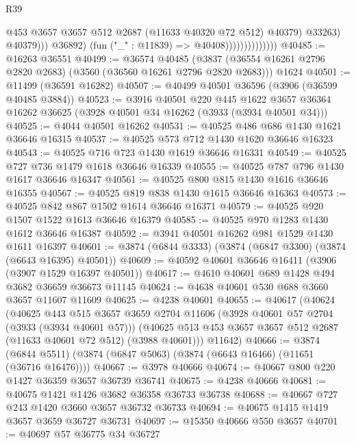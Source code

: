 \begin{lexlean}{R39}
\begin{coremodule}
                                          @453
                                          @3657
                                          @3657
                                          @512
                                          @2687
                                          (@11633 @40320 @72 @512)
                                          @40379)
                                        @33263)
                                      @40379)))
                                @36892)
                              (fun ("_" : @11839) => @40408))))))))))))))
@40485 := @16263 @36551
@40499 := @36574
    @40485
    (@3837 (@36554 @16261 @2796 @2820 @2683) (@3560 (@36560 @16261 @2796 @2820 @2683)))
    @1624
@40501 := @11499 (@36591 @16282)
@40507 := @40499 @40501 @36596 (@3906 (@36599 @40485 @3884))
@40523 := @3916
    @40501
    @220
    @445
    @1622
    @3657
    @36364
    @16262
    @36625
    (@3928 @40501 @34 @16262 (@3933 (@3934 @40501 @34)))
@40525 := @4044 @40501 @16262
@40531 := @40525 @486 @686 @1430 @1621 @36646 @16315
@40537 := @40525 @573 @712 @1430 @1620 @36646 @16323
@40543 := @40525 @716 @723 @1430 @1619 @36646 @16331
@40549 := @40525 @727 @736 @1479 @1618 @36646 @16339
@40555 := @40525 @787 @796 @1430 @1617 @36646 @16347
@40561 := @40525 @800 @815 @1430 @1616 @36646 @16355
@40567 := @40525 @819 @838 @1430 @1615 @36646 @16363
@40573 := @40525 @842 @867 @1502 @1614 @36646 @16371
@40579 := @40525 @920 @1507 @1522 @1613 @36646 @16379
@40585 := @40525 @970 @1283 @1430 @1612 @36646 @16387
@40592 := @3941 @40501 @16262 @981 @1529 @1430 @1611 @16397
@40601 := @3874 (@6844 @3333) (@3874 (@6847 @3300) (@3874 (@6643 @16395) @40501))
@40609 := @40592 @40601 @36646 @16411 (@3906 (@3907 @1529 @16397 @40501))
@40617 := @4610 @40601 @689 @1428 @494 @3682 @36659 @36673 @11145
@40624 := @4638 @40601 @530 @688 @3660 @3657 @11607 @11609
@40625 := @4238 @40601
@40655 := @40617
    (@40624
      (@40625
        @443
        @515
        @3657
        @3659
        @2704
        @11606
        (@3928 @40601 @57 @2704 (@3933 (@3934 @40601 @57)))
        (@40625 @513 @453 @3657 @3657 @512 @2687 (@11633 @40601 @72 @512) (@3988 @40601)))
      @11642)
@40666 := @3874 (@6844 @5511) (@3874 (@6847 @5063) (@3874 (@6643 @16466) (@11651 (@36716 @16476))))
@40667 := @3978 @40666
@40674 := @40667 @800 @220 @1427 @36359 @3657 @36739 @36741
@40675 := @4238 @40666
@40681 := @40675 @1421 @1426 @3682 @36358 @36733 @36738
@40688 := @40667 @727 @243 @1420 @3660 @3657 @36732 @36733
@40694 := @40675 @1415 @1419 @3657 @3659 @36727 @36731
@40697 := @15350 @40666 @550 @3657
@40701 := @40697 @57 @36775 @34 @36727

\end{coremodule}
\end{lexlean}
